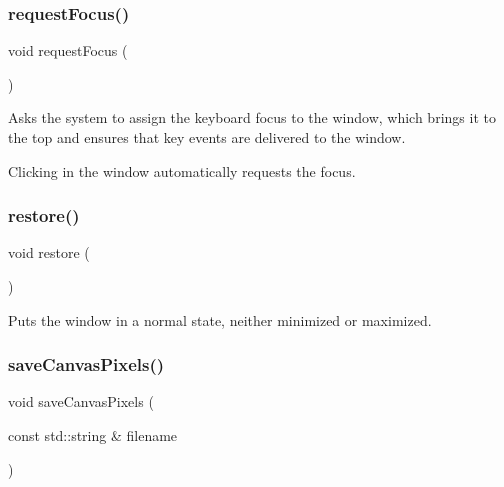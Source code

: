 \subsubsection{\texorpdfstring{request\+Focus()}{requestFocus()}}
{\footnotesize\ttfamily void request\+Focus (\begin{DoxyParamCaption}{ }\end{DoxyParamCaption})\hspace{0.3cm}{\ttfamily [virtual]}}



Asks the system to assign the keyboard focus to the window, which brings it to the top and ensures that key events are delivered to the window. 

Clicking in the window automatically requests the focus. \mbox{\label{classGWindow_afd3595051be2709847c2de4352f27cf5}} 
\subsubsection{\texorpdfstring{restore()}{restore()}}
{\footnotesize\ttfamily void restore (\begin{DoxyParamCaption}{ }\end{DoxyParamCaption})\hspace{0.3cm}{\ttfamily [virtual]}}



Puts the window in a normal state, neither minimized or maximized. 

\mbox{\label{classGWindow_aba99f6a53d9bb0493e7fc3ead6a2e4a3}} 
\subsubsection{\texorpdfstring{save\+Canvas\+Pixels()}{saveCanvasPixels()}}
{\footnotesize\ttfamily void save\+Canvas\+Pixels (\begin{DoxyParamCaption}\item[{const std\+::string \&}]{filename }\end{DoxyParamCaption})\hspace{0.3cm}{\ttfamily [virtual]}}



